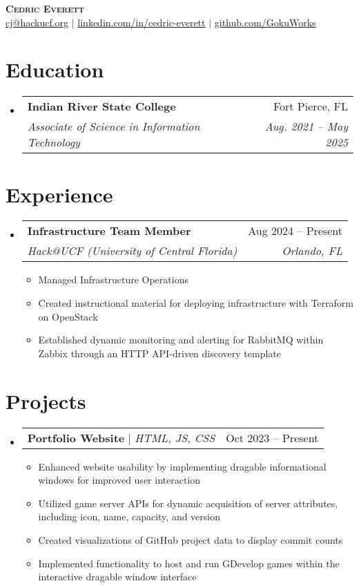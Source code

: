 \documentclass[letterpaper,11pt]{article}
\makeatletter
\newcommand{\resumeItem}[1]{
  \item\small{
    {#1 \vspace{-2pt}}
  }
}
\newcommand{\resumeSubheading}[4]{
  \vspace{-2pt}\item
    \begin{tabular*}{0.97\textwidth}[t]{l@{\extracolsep{\fill}}r}
      \textbf{#1} & #2 \\
      \textit{\small#3} & \textit{\small #4} \\
    \end{tabular*}\vspace{-7pt}
}
\newcommand{\resumeProjectHeading}[2]{
    \item
    \begin{tabular*}{0.97\textwidth}{l@{\extracolsep{\fill}}r}
      \small#1 & #2 \\
    \end{tabular*}\vspace{-7pt}
}
\newcommand{\resumeSubHeadingListStart}{\begin{itemize}[leftmargin=0.15in, label={}]}
\newcommand{\resumeSubHeadingListEnd}{\end{itemize}}
\newcommand{\resumeItemListStart}{\begin{itemize}}
\newcommand{\resumeItemListEnd}{\end{itemize}\vspace{-5pt}}
\makeatother
\begin{document}
\begin{center}
    \textbf{\Huge \scshape Cedric Everett} \\ \vspace{1pt}
    \small \href{mailto:cj@hackucf.org}{\underline{cj@hackucf.org}} $|$ 
    \href{https://www.linkedin.com/in/cedric-everett/}{\underline{linkedin.com/in/cedric-everett}} $|$
    \href{https://github.com/GokuWorks}{\underline{github.com/GokuWorks}}
\end{center}


\section{Education}
  \resumeSubHeadingListStart
    \resumeSubheading
      {Indian River State College}{Fort Pierce, FL}
      {Associate of Science in Information Technology}{Aug. 2021 -- May 2025}
  \resumeSubHeadingListEnd


\section{Experience}
  \resumeSubHeadingListStart

    \resumeSubheading
      {Infrastructure Team Member}{Aug 2024 -- Present}
      {Hack@UCF (University of Central Florida)}{Orlando, FL}
      \resumeItemListStart
        \resumeItem{Managed Infrastructure Operations}
        \resumeItem{Created instructional material for deploying infrastructure with Terraform on OpenStack}
        \resumeItem{Established dynamic monitoring and alerting for RabbitMQ within Zabbix through an HTTP API-driven discovery template}
      \resumeItemListEnd
  \resumeSubHeadingListEnd


\section{Projects}
    \resumeSubHeadingListStart
      \resumeProjectHeading
          {\textbf{Portfolio Website} $|$ \emph{HTML, JS, CSS}}{Oct 2023 -- Present}
          \resumeItemListStart
            \resumeItem{Enhanced website usability by implementing dragable informational windows for improved user interaction}
            \resumeItem{Utilized game server APIs for dynamic acquisition of server attributes, including icon, name, capacity, and version}
            \resumeItem{Created visualizations of GitHub project data to display commit counts}
            \resumeItem{Implemented functionality to host and run GDevelop games within the interactive dragable window interface}
          \resumeItemListEnd
    \resumeSubHeadingListEnd
\end{document}

